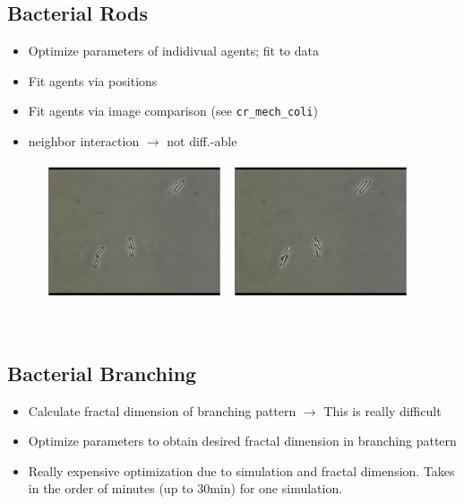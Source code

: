 \documentclass{article}
\newcommand{\todo}[1]{\colorbox{WildStrawberry}{\textcolor{white}{#1}}}
\begin{document}
\subsection{Bacterial Rods}
\label{subsection:bacterial-rods}
\begin{itemize}
    \item Optimize parameters of indidivual agents; fit to data
    \item Fit agents via positions
    \item Fit agents via image comparison (see \texttt{cr\_mech\_coli})
    \item neighbor interaction $\rightarrow$ not diff.-able
\end{itemize}

\begin{figure}[H]
    \centering
    \includegraphics[width=0.48\textwidth]{figures/cr_mech_coli-estim-param/microscopic-images-0.png}%
    \hspace{0.04\textwidth}%
    \includegraphics[width=0.48\textwidth]{figures/cr_mech_coli-estim-param/microscopic-images-1.png}%
    \caption{\todo{caption}}
    \label{fig:bacterial-rods-sim}
\end{figure}

\subsection{Bacterial Branching}
\label{subsection:bacterial-branching}
\begin{itemize}
    \item Calculate fractal dimension of branching pattern $\rightarrow$ This is really difficult
    \item Optimize parameters to obtain desired fractal dimension in branching pattern
    \item Really expensive optimization due to simulation and fractal dimension.
        Takes in the order of minutes (up to $30$min) for one simulation.
\end{itemize}
\end{document}
